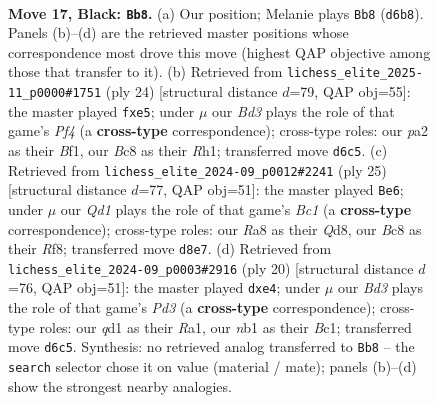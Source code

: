 \documentclass[11pt]{article}
\begin{document}
\clearpage

\begin{figure}[p]\centering
\begin{subfigure}{0.46\textwidth}\centering
\resizebox{\linewidth}{!}{%
\newchessgame
\chessboard[
  setfen={r1bqr1k1/pp3ppp/1n1bp3/2P1n3/3p2P1/1P4KB/P2P1P1P/RNBQR3 b - - 0 17},
  showmover=false,
  pgfstyle=straightmove, color=movearrow, markmove={d6-b8}
]}
\caption{}
\end{subfigure}\hfill
\begin{subfigure}{0.46\textwidth}\centering
\resizebox{\linewidth}{!}{%
\newchessgame
\chessboard[
  setfen={r1b1kb1r/1pq2p2/p3pnpp/4p3/3N1P2/2N3Q1/PPP3PP/2KR1B1R w kq - 0 13},
  showmover=false,
  pgfstyle=straightmove, color=movearrow, markmove={f4-e5}
]}
\caption{}
\end{subfigure}
\\[4pt]
\begin{subfigure}{0.46\textwidth}\centering
\resizebox{\linewidth}{!}{%
\newchessgame
\chessboard[
  setfen={1rbq1rk1/2p1bppp/p7/P2nR3/1p6/1BP5/1P1P1PPP/RNBQ2K1 b - - 0 13},
  showmover=false,
  pgfstyle=straightmove, color=movearrow, markmove={c8-e6}
]}
\caption{}
\end{subfigure}\hfill
\begin{subfigure}{0.46\textwidth}\centering
\resizebox{\linewidth}{!}{%
\newchessgame
\chessboard[
  setfen={r1bq1rk1/ppp1n1pp/3p4/3Pp3/1b2p3/3P1NP1/PP3PBP/R1BQ1RK1 w - - 0 11},
  showmover=false,
  pgfstyle=straightmove, color=movearrow, markmove={d3-e4}
]}
\caption{}
\end{subfigure}
\caption{\textbf{Move 17, Black: \texttt{Bb8}.} (a) Our position; Melanie plays \texttt{Bb8} (\texttt{d6b8}). Panels (b)--(d) are the retrieved master positions whose correspondence most drove this move (highest QAP objective among those that transfer to it). (b) Retrieved from \texttt{lichess\_elite\_2025-11\_p0000\#1751} (ply 24) [structural distance $d$=79, QAP obj=55]: the master played \texttt{fxe5}; under $\mu$ our \emph{Bd3} plays the role of that game's \emph{Pf4} (a \textbf{cross-type} correspondence); cross-type roles: our \emph{p}a2 as their \emph{B}f1, our \emph{B}c8 as their \emph{R}h1; transferred move \texttt{d6c5}. (c) Retrieved from \texttt{lichess\_elite\_2024-09\_p0012\#2241} (ply 25) [structural distance $d$=77, QAP obj=51]: the master played \texttt{Be6}; under $\mu$ our \emph{Qd1} plays the role of that game's \emph{Bc1} (a \textbf{cross-type} correspondence); cross-type roles: our \emph{R}a8 as their \emph{Q}d8, our \emph{B}c8 as their \emph{R}f8; transferred move \texttt{d8e7}. (d) Retrieved from \texttt{lichess\_elite\_2024-09\_p0003\#2916} (ply 20) [structural distance $d$=76, QAP obj=51]: the master played \texttt{dxe4}; under $\mu$ our \emph{Bd3} plays the role of that game's \emph{Pd3} (a \textbf{cross-type} correspondence); cross-type roles: our \emph{q}d1 as their \emph{R}a1, our \emph{n}b1 as their \emph{B}c1; transferred move \texttt{d6c5}. Synthesis: no retrieved analog transferred to \texttt{Bb8} -- the \texttt{search} selector chose it on value (material / mate); panels (b)--(d) show the strongest nearby analogies.}
\label{fig:thought-m33}
\end{figure}
\end{document}
